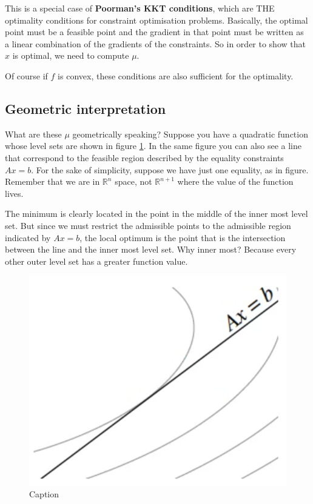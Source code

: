 This is a special case of \textbf{Poorman's KKT conditions}, which are THE optimality conditions for constraint optimisation problems. Basically, the optimal point must be a feasible point and the gradient in that point must be written as a linear combination of the gradients of the constraints. So in order to show that $x$ is optimal, we need to compute $\mu$.
\par Of course if $f$ is convex, these conditions are also sufficient for the optimality.
\subsection{Geometric interpretation}
\par What are these $\mu$ geometrically speaking? Suppose you have a quadratic function whose level sets are shown in figure \ref{fig:chapter3-contraint_equality_1}. In the same figure you can also see a line that correspond to the feasible region described by the equality constraints $Ax = b$. For the sake of simplicity, suppose we have just one equality, as in figure. Remember that we are in $\mathbb{R}^n$ space, not $\mathbb{R}^{n+1}$ where the value of the function lives.
\par The minimum is clearly located in the point in the middle of the inner most level set. But since we must restrict the admissible points to the admissible region indicated by $Ax = b$, the local optimum is the point that is the intersection between the line and the inner most level set. Why inner most? Because every other outer level set has a greater function value.
\begin{figure}
    \centering
    \includegraphics[scale=0.5]{figures/3/chapter3-constraint_equality_1.png}
    \caption{Caption}
    \label{fig:chapter3-contraint_equality_1}
\end{figure}
